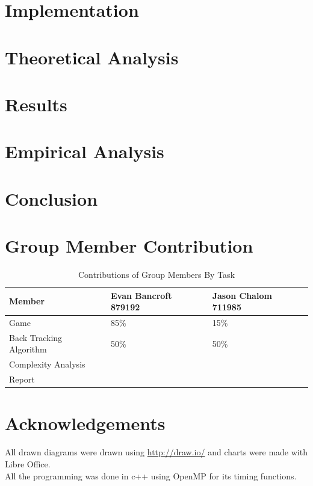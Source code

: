 \documentclass[a4paper]{article}
\begin{document}
\section{Implementation}


\section{Theoretical Analysis}

\section{Results}

\section{Empirical Analysis}


\section{Conclusion}

\section{Group Member Contribution}
\begin{table}[H]
\centering
\label{contribution}
\begin{tabular}{|l|l|l|}
\hline
\textbf{Member}         & \textbf{Evan Bancroft 879192} & \textbf{Jason Chalom 711985} \\ \hline
Game                    & 85\%                          & 15\%                         \\ \hline
Back Tracking Algorithm & 50\%                          & 50\%                         \\ \hline
Complexity Analysis     &                               &                              \\ \hline
Report                  &                               &                              \\ \hline
\end{tabular}
\caption{Contributions of Group Members By Task}
\end{table}

\section*{Acknowledgements}
All drawn diagrams were drawn using \url{http://draw.io/} and charts were made with Libre Office.\\ 
All the programming was done in c++ using OpenMP for its timing functions.\\



{}
\end{document}
